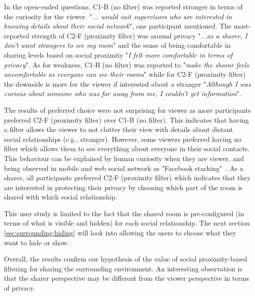 In the open-ended questions, C1-B (no filter) was reported stronger in terms of the curiosity for the viewer. "\textit{... would suit supervisors who are interested in knowing details about their social network}", one participant mentioned. The most-reported strength of C2-F (proximity filter) was around privacy "\textit{...as a sharer, I don't want strangers to see my room}" and the sense of being comfortable in sharing levels based on social proximity "\textit{I felt more comfortable in terms of privacy}". As for weakness, C1-B (no filter) was reported to "\textit{make the sharar feels uncomfortable as everyone can see their rooms}" while for C2-F (proximity filter) the downside is more for the viewer if interested about a stranger "\textit{Although I was curious about someone who was far away from me, I couldn't get information}".

The results of preferred choice were not surprising for viewer as more participants preferred C2-F (proximity filter) over C1-B (no filter). This indicates that having a filter allows the viewer to not clutter their view with details about distant social relationships (e.g., stranger). However, some viewers preferred having no filter which allows them to see everything about everyone in their social contacts. This behaviour can be explained by human curiosity when they are viewer, and being observed in mobile and web social network as "Facebook stacking"~\cite{Tong2013, Lyndon2011}. As a sharer, all participants preferred C2-F (proximity filter) which indicates that they are interested in protecting their privacy by choosing which part of the room is shared with which social relationship.

This user study is limited to the fact that the shared room is pre-configured (in terms of what is visible and hidden) for each social relationship. The next section \ref{sec:surrounding:hiding} will look into allowing the users to choose what they want to hide or show. 

Overall, the results confirm our hypothesis of the value of social proximity-based filtering for sharing the surrounding environment. An interesting observation is that the sharer perspective may be different from the viewer perspective in terms of privacy. 


